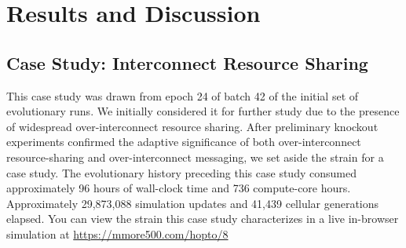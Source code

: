 \section{Results and Discussion} \label{sec:results}









% 

\subsection{Case Study: Interconnect Resource Sharing}



This case study was drawn from epoch 24 of batch 42 of the initial set of evolutionary runs.
We initially considered it for further study due to the presence of widespread over-interconnect resource sharing.
After preliminary knockout experiments confirmed the adaptive significance of both over-interconnect resource-sharing and over-interconnect messaging, we set aside the strain for a case study.
The evolutionary history preceding this case study consumed approximately 96 hours of wall-clock time and 736 compute-core hours.
Approximately 29,873,088 simulation updates and 41,439 cellular generations elapsed.
You can view the strain this case study characterizes in a live in-browser simulation at \url{https://mmore500.com/hopto/8}


